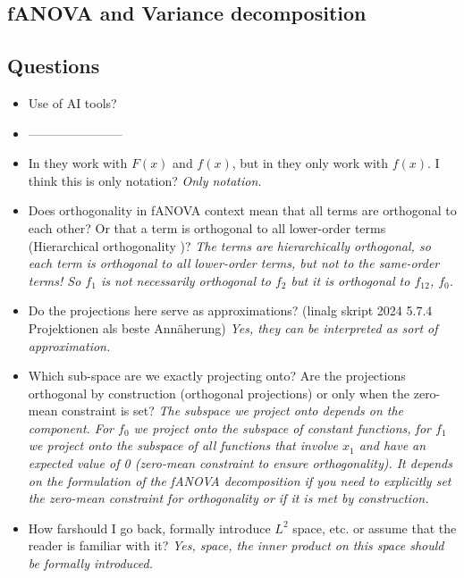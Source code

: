 \subsection{fANOVA and Variance decomposition}


\subsection*{Questions}



\begin{itemize}
    \item Use of AI tools?
    \item -----------------------
    \item In \cite{hooker_discovering_2004} they work with $F(x)$ and $f(x)$, but in \cite{sobol_global_2001} they only work with $f(x)$. I think this is only notation? \textit{Only notation.}
    \item Does orthogonality in fANOVA context mean that all terms are orthogonal to each other? Or that a term is orthogonal to all lower-order terms (\ldq Hierarchical orthogonality \rdq)? \textit{The terms are hierarchically orthogonal, so each term is orthogonal to all lower-order terms, but not to the same-order terms! So $f_1$ is not necessarily orthogonal to $f_2$ but it is orthogonal to $f_{12}$, $f_{0}$.} 
    \item Do the projections here serve as approximations? (linalg skript 2024 5.7.4 Projektionen als beste Annäherung) \textit{Yes, they can be interpreted as sort of approximation.}
    \item Which sub-space are we exactly projecting onto? Are the projections orthogonal by construction (orthogonal projections) or only when the zero-mean constraint is set? \textit{The subspace we project onto depends on the component. For $f_0$ we project onto the subspace of constant functions, for $f_1$ we project onto the subspace of all functions that involve $x_1$ and have an expected value of 0 (zero-mean constraint to ensure orthogonality). It depends on the formulation of the fANOVA decomposition if you need to explicitly set the zero-mean constraint for orthogonality or if it is met by construction.}
    \item How \ldq far\rdq should I go back, formally introduce $L^2$ space, etc. or assume that the reader is familiar with it? \textit{Yes, space, the inner product on this space should be formally introduced.}
\end{itemize}


